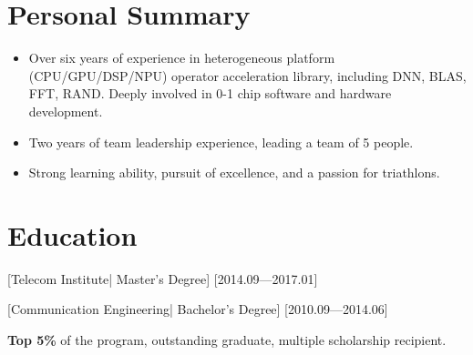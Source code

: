 \documentclass{resume}
\begin{document}


\ResumeTitle


\section{Personal Summary}

\begin{itemize}
  \item Over six years of experience in heterogeneous platform (CPU/GPU/DSP/NPU) operator acceleration library, including DNN, BLAS, FFT, RAND. Deeply involved in 0-1 chip software and hardware development.
  \item Two years of team leadership experience, leading a team of 5 people.
  \item Strong learning ability, pursuit of excellence, and a passion for triathlons.
\end{itemize}

\section{Education}
[\textnormal{Telecom Institute|} Master's Degree]
[2014.09—2017.01]

\nocite{*} %
\printbibliography[heading={none}]



[\textnormal{Communication Engineering|} Bachelor's Degree]
[2010.09—2014.06]

\textbf{Top 5\%} of the program, outstanding graduate, multiple scholarship recipient.

\end{document}
